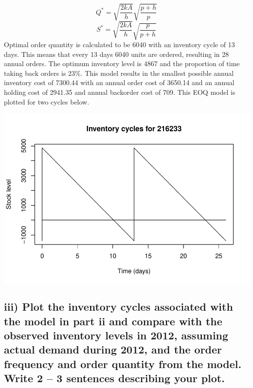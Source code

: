 \documentclass[
  11pt,
]{article}
\begin{document}
\[Q^* = \sqrt{\frac{2kA}{h}} \sqrt{\frac{p+h}{p}} \]
\[S^* = \sqrt{\frac{2kA}{h}} \sqrt{\frac{p}{p+h}} \] Optimal order
quantity is calculated to be 6040 with an inventory cycle of 13 days.
This means that every 13 days 6040 units are ordered, resulting in 28
annual orders. The optimum inventory level is 4867 and the proportion of
time taking back orders is 23\%. This model results in the smallest
possible annual inventory cost of 7300.44 with an annual order cost of
3650.14 and an annual holding cost of 2941.35 and annual backorder cost
of 709. This EOQ model is plotted for two cycles below.

\includegraphics{Assignment-STAT702_files/figure-latex/2aii plot-1.pdf}

\hypertarget{iii-plot-the-inventory-cycles-associated-with-the-model-in-part-ii-and-compare-with-the-observed-inventory-levels-in-2012-assuming-actual-demand-during-2012-and-the-order-frequency-and-order-quantity-from-the-model.-write-2-3-sentences-describing-your-plot.}{%
\subsection{iii) Plot the inventory cycles associated with the model in
part ii and compare with the observed inventory levels in 2012, assuming
actual demand during 2012, and the order frequency and order quantity
from the model. Write 2 -- 3 sentences describing your
plot.}\label{iii-plot-the-inventory-cycles-associated-with-the-model-in-part-ii-and-compare-with-the-observed-inventory-levels-in-2012-assuming-actual-demand-during-2012-and-the-order-frequency-and-order-quantity-from-the-model.-write-2-3-sentences-describing-your-plot.}}
\end{document}
